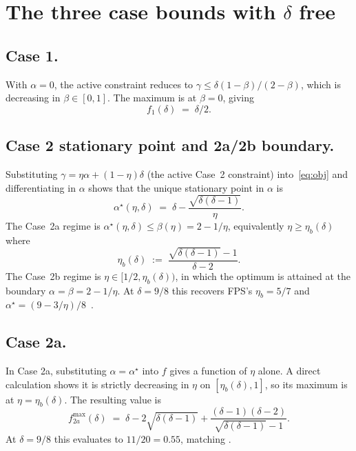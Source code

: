 \documentclass[11pt,a4paper]{article}
\theoremstyle{definition}
\begin{document}
\section{The three case bounds with $\delta$ free}\label{sec:cases}

\subsection{Case 1.}
With $\alpha = 0$, the active constraint reduces to
$\gamma \le \delta(1 - \beta)/(2 - \beta)$, which is decreasing in
$\beta \in [0, 1]$. The maximum is at $\beta = 0$, giving
\[
   f_1(\delta) \;=\; \delta / 2.
\]

\subsection{Case 2 stationary point and 2a/2b boundary.}
Substituting $\gamma = \eta \alpha + (1 - \eta) \delta$ (the active
Case~2 constraint) into~\eqref{eq:obj} and differentiating in
$\alpha$ shows that the unique stationary point in $\alpha$ is
\begin{equation}\label{eq:alphastar}
  \alpha^{\star}(\eta, \delta) \;=\;
     \delta - \frac{\sqrt{\delta(\delta - 1)}}{\eta}.
\end{equation}
The Case~2a regime is $\alpha^{\star}(\eta, \delta) \le \beta(\eta)
= 2 - 1/\eta$, equivalently $\eta \ge \eta_b(\delta)$ where
\begin{equation}\label{eq:etab}
  \eta_b(\delta) \;:=\; \frac{\sqrt{\delta(\delta - 1)} - 1}{\delta - 2}.
\end{equation}
The Case~2b regime is $\eta \in [1/2, \eta_b(\delta))$, in which
the optimum is attained at the boundary $\alpha = \beta = 2 - 1/\eta$.
At $\delta = 9/8$ this recovers FPS's $\eta_b = 5/7$ and
$\alpha^{\star} = (9 - 3/\eta)/8$~\cite[p.~10]{FPS}.

\subsection{Case 2a.}
In Case 2a, substituting $\alpha = \alpha^{\star}$ into $f$ gives a
function of $\eta$ alone. A direct calculation shows it is strictly
decreasing in $\eta$ on $[\eta_b(\delta), 1]$, so its maximum is at
$\eta = \eta_b(\delta)$. The resulting value is
\begin{equation}\label{eq:f2amax}
  f_{2a}^{\max}(\delta) \;=\;
     \delta - 2 \sqrt{\delta(\delta - 1)}
            + \frac{(\delta - 1)(\delta - 2)}{\sqrt{\delta(\delta - 1)} - 1}.
\end{equation}
At $\delta = 9/8$ this evaluates to $11/20 = 0.55$, matching
\cite[p.~10]{FPS}.
\end{document}
